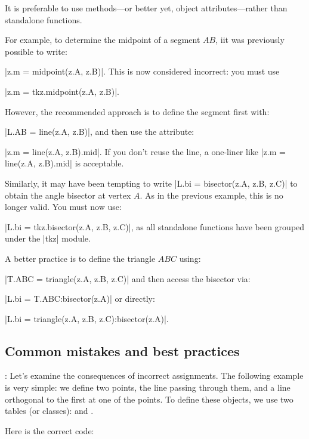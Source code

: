 It is preferable to use methods—or better yet, object attributes—rather than standalone functions.

For example, to determine the midpoint of a segment $AB$, iit was previously possible to write:

|z.m = midpoint(z.A, z.B)|.  This is now considered incorrect: you must use

|z.m = tkz.midpoint(z.A, z.B)|.

However, the recommended approach is to define the segment first with:

|L.AB = line(z.A, z.B)|, and then use the attribute:

|z.m = line(z.A, z.B).mid|. If you don't reuse the line, a one-liner like |z.m = line(z.A, z.B).mid| is acceptable.

\vspace{12pt}
Similarly, it may have been tempting to write |L.bi = bisector(z.A, z.B, z.C)| to obtain the angle bisector at vertex $A$. As in the previous example, this is no longer valid. You must now use:

|L.bi = tkz.bisector(z.A, z.B, z.C)|, as all standalone functions have been grouped under the |tkz| module.

A better practice is to define the triangle $ABC$ using:

|T.ABC = triangle(z.A, z.B, z.C)| and then access the bisector via:

|L.bi = T.ABC:bisector(z.A)| or directly:

|L.bi = triangle(z.A, z.B, z.C):bisector(z.A)|.

\subsection{Common mistakes and best practices}

\vspace{1em}
\tkzRHand{\textcolor{red}{Second Warning}}: Let's examine the consequences of incorrect assignments. The following example is very simple: we define two points, the line passing through them, and a line orthogonal to the first at one of the points. To define these objects, we use two tables (or classes):  and .

Here is the correct code:
\begin{tkzexample}[latex=.5\textwidth]
\end{tkzexample}

